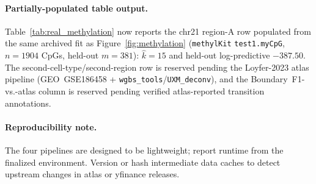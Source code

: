\paragraph{Partially-populated table output.}
Table~\ref{tab:real_methylation} now reports the chr21 region-A row populated from the same archived fit as Figure~\ref{fig:methylation} (\texttt{methylKit} \texttt{test1.myCpG}, $n=1904$ CpGs, held-out $m=381$): $\widehat k=15$ and held-out log-predictive $-387.50$. The second-cell-type/second-region row is reserved pending the Loyfer-2023 atlas pipeline (GEO~GSE186458 + \texttt{wgbs\_tools}/\texttt{UXM\_deconv}), and the Boundary~F1-vs.-atlas column is reserved pending verified atlas-reported transition annotations.

\paragraph{Reproducibility note.}
The four pipelines are designed to be lightweight; report runtime from the finalized environment. Version or hash intermediate data caches to detect upstream changes in
atlas or yfinance releases.
